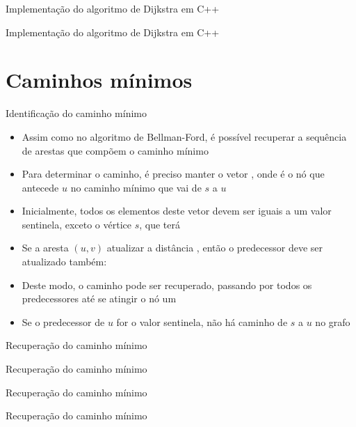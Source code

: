 \begin{frame}[fragile]{Implementação do algoritmo de Dijkstra em C++}
\end{frame}

\begin{frame}[fragile]{Implementação do algoritmo de Dijkstra em C++}
\end{frame}

\section{Caminhos mínimos}


\begin{frame}[fragile]{Identificação do caminho mínimo}

    \begin{itemize}
        \item Assim como no algoritmo de Bellman-Ford, é possível recuperar a sequência de 
            arestas que compõem o caminho mínimo

        \item Para determinar o caminho, é preciso manter o vetor , onde
             é o nó que antecede $u$ no caminho mínimo que vai de $s$ a 
            $u$

        \item Inicialmente, todos os elementos deste vetor devem ser iguais a um valor sentinela,
            exceto o vértice $s$, que terá 

        \item Se a aresta $(u, v)$ atualizar a distância , então o 
            predecessor deve ser atualizado também: 

        \item Deste modo, o caminho pode ser recuperado, passando por todos os predecessores até
            se atingir o nó um

        \item Se o predecessor de $u$ for o valor sentinela, não há caminho de $s$ a $u$ no
            grafo
    \end{itemize}

\end{frame}

\begin{frame}[fragile]{Recuperação do caminho mínimo}
\end{frame}

\begin{frame}[fragile]{Recuperação do caminho mínimo}
\end{frame}

\begin{frame}[fragile]{Recuperação do caminho mínimo}
\end{frame}

\begin{frame}[fragile]{Recuperação do caminho mínimo}
\end{frame}
